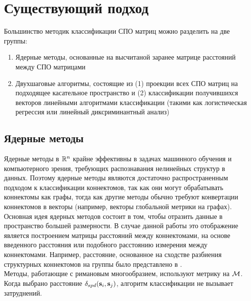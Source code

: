 \chapter{Существующий подход}
\indent Большинство методик классификации СПО матриц можно разделить на две группы:
\begin{enumerate}
    \item Ядерные методы, основанные на высчитаной заранее матрице расстояний между СПО матрицами
    \item Двухшаговые алгоритмы, состоящие из (1) проекции всех СПО матриц на подходящее касательное пространство и (2) классификации получившихся векторов линейными алгоритмами классификации (такими как логистическая регрессия или линейный диксриминантный анализ)
\end{enumerate}

\section{Ядерные методы}
\indent Ядерные методы в $\mathbb{R}^n$ крайне эффективны в задачах машинного обучения и компьютерного зрения, требующих распознавания нелинейных структур в данных. Поэтому ядерные методы являются достаточно распространенным подходом к классификации коннектомов, так как они могут обрабатывать коннектомы как графы, тогда как другие методы обычно требуют конвертации коннектомов в векторы (например, векторы глобальной метрики на графах). Основная идея ядерных методов состоит в том, чтобы отразить данные в пространство большей размерности. В случае данной работы это отображение является построением матрицы расстояний между коннектомами, на основе введенного расстояния или подобного расстоянию измерения между коннектомами. Например, расстояние, основанное на сходстве разбиения структурных коннектомов на группы было представлено в \cite{kurmukov2016classification}.\\
\indent Методы, работающие с римановым многообразием, используют метрику на $\mathcal{M}$. Когда выбрано расстояние $\delta_{spd}({\bf s}_i, {\bf s}_j)$, алгоритм классификации не вызывает затруднений. 
